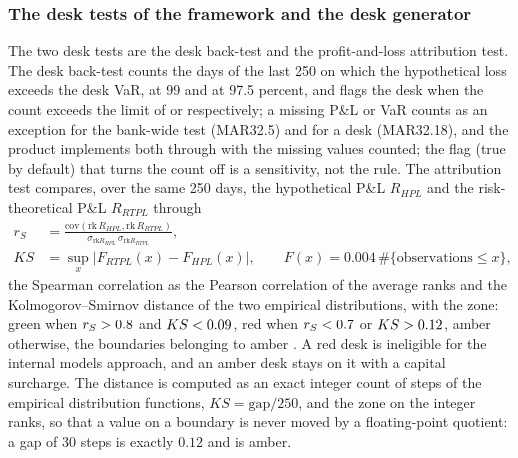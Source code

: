 \subsubsection{The desk tests of the framework and the desk generator}
The two desk tests are the desk back-test and the profit-and-loss attribution test. The desk back-test counts the days of the last 250 on which the hypothetical loss
exceeds the desk VaR, at 99 and at 97.5 percent, and flags the desk when the count exceeds the limit of \mkDeskLimitNN{} or \mkDeskLimitNF{} respectively; a missing
P\&L or VaR counts as an exception for the bank-wide test (MAR32.5) and for a desk (MAR32.18), and the product implements both through  with the missing values counted;
the flag  (true by default) that turns the count off is a sensitivity, not the rule. The attribution test compares,
over the same 250 days, the hypothetical P\&L $R_{HPL}$ and the risk-theoretical P\&L $R_{RTPL}$ through
\begin{align}
r_S&=\frac{\mathrm{cov}(\mathrm{rk}\,R_{HPL},\mathrm{rk}\,R_{RTPL})}{\sigma_{\mathrm{rk}R_{HPL}}\,\sigma_{\mathrm{rk}R_{RTPL}}},\\
KS&=\sup_x\big|F_{RTPL}(x)-F_{HPL}(x)\big|,\qquad F(x)=0.004\,\#\{\text{observations}\le x\},
\label{eq:mk-pla}
\end{align}
the Spearman correlation as the Pearson correlation of the average ranks and the Kolmogorov--Smirnov distance of the two empirical distributions, with the zone: green when
$r_S>0.8{}$ and $KS<0.09{}$, red when $r_S<0.7{}$ or $KS>0.12{}$, amber otherwise, the boundaries belonging to amber \citep{market:bcbsmar32}. A red desk is
ineligible for the internal models approach, and an amber desk stays on it with a capital surcharge. The distance is computed as an exact integer count of steps of the empirical
distribution functions, $KS=\text{gap}/250$, and the zone on the integer ranks, so that a value on a boundary is never moved by a floating-point quotient: a gap of 30 steps is exactly $0.12$
and is amber.

